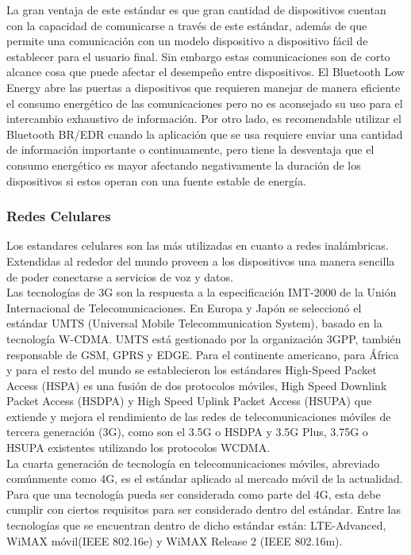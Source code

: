La gran ventaja de este estándar es que gran cantidad de dispositivos cuentan con la capacidad de comunicarse a través de este estándar, además de que permite una comunicación con un modelo dispositivo a dispositivo fácil de establecer para el usuario final. Sin embargo estas comunicaciones son de corto alcance cosa que puede afectar el desempeño entre dispositivos. El Bluetooth Low Energy abre las puertas a dispositivos que requieren manejar de manera eficiente el consumo energético de las comunicaciones pero no es aconsejado su uso para el intercambio exhaustivo de información. Por otro lado, es recomendable utilizar el Bluetooth BR/EDR cuando la aplicación que se usa requiere enviar una cantidad de información importante o continuamente, pero tiene la desventaja que el consumo energético es mayor afectando negativamente la duración de los dispositivos si estos operan con una fuente estable de energía.

\subsubsection{Redes Celulares}
Los estandares celulares son las más utilizadas en cuanto a redes inalámbricas. Extendidas al rededor del mundo proveen a los dispositivos una manera sencilla de poder conectarse a servicios de voz y datos. \\

Las tecnologías de 3G son la respuesta a la especificación IMT-2000 de la Unión Internacional de Telecomunicaciones\cite{itu2000}. En Europa y Japón se seleccionó el estándar UMTS (Universal Mobile Telecommunication System)\cite{umts}, basado en la tecnología W-CDMA\cite{wcdma}. UMTS está gestionado por la organización 3GPP, también responsable de GSM, GPRS y EDGE. Para el continente americano, para África y para el resto del mundo se establecieron los estándares High-Speed Packet Access (HSPA)\cite{hspa} es una fusión de dos protocolos móviles, High Speed Downlink Packet Access (HSDPA)\cite{hspa} y High Speed Uplink Packet Access (HSUPA)\cite{hspa} que extiende y mejora el rendimiento de las redes de telecomunicaciones móviles de tercera generación (3G), como son el 3.5G o HSDPA y 3.5G Plus, 3.75G o HSUPA existentes utilizando los protocolos WCDMA.\\

La cuarta generación de tecnología en telecomunicaciones móviles, abreviado comúnmente como 4G, es el estándar aplicado al mercado móvil de la actualidad. Para que una tecnología pueda ser considerada como parte del 4G, esta debe cumplir con ciertos requisitos para ser considerado dentro del estándar. Entre las tecnologías que se encuentran dentro de dicho estándar están: LTE-Advanced\cite{LTE-advanced}, WiMAX móvil(IEEE 802.16e)\cite{ieee80216} y WiMAX Release 2 (IEEE 802.16m).\cite{ieee80216}\\

